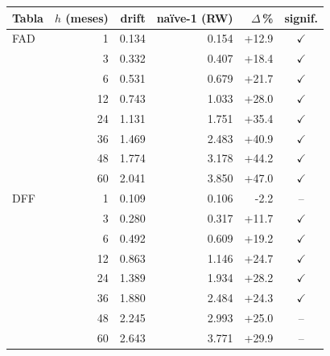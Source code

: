 \begin{tabular}{lrrrrc}
\toprule
Tabla & $h$ (meses) & drift & naïve-1 (RW) & $\Delta$\,\% & signif. \\
\midrule
FAD & 1 & 0.134 & 0.154 & +12.9 & $\checkmark$ \\
 & 3 & 0.332 & 0.407 & +18.4 & $\checkmark$ \\
 & 6 & 0.531 & 0.679 & +21.7 & $\checkmark$ \\
 & 12 & 0.743 & 1.033 & +28.0 & $\checkmark$ \\
 & 24 & 1.131 & 1.751 & +35.4 & $\checkmark$ \\
 & 36 & 1.469 & 2.483 & +40.9 & $\checkmark$ \\
 & 48 & 1.774 & 3.178 & +44.2 & $\checkmark$ \\
 & 60 & 2.041 & 3.850 & +47.0 & $\checkmark$ \\
\midrule
DFF & 1 & 0.109 & 0.106 & -2.2 & -- \\
 & 3 & 0.280 & 0.317 & +11.7 & $\checkmark$ \\
 & 6 & 0.492 & 0.609 & +19.2 & $\checkmark$ \\
 & 12 & 0.863 & 1.146 & +24.7 & $\checkmark$ \\
 & 24 & 1.389 & 1.934 & +28.2 & $\checkmark$ \\
 & 36 & 1.880 & 2.484 & +24.3 & $\checkmark$ \\
 & 48 & 2.245 & 2.993 & +25.0 & -- \\
 & 60 & 2.643 & 3.771 & +29.9 & -- \\
\bottomrule
\end{tabular}
